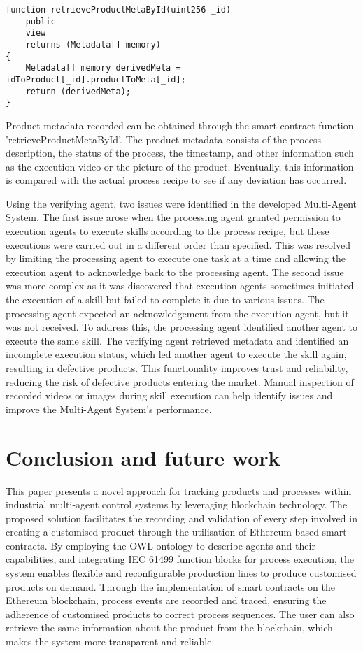 \begin{bibunit}
\begin{lstlisting}
function retrieveProductMetaById(uint256 _id)
    public
    view
    returns (Metadata[] memory)
{
    Metadata[] memory derivedMeta = idToProduct[_id].productToMeta[_id];
    return (derivedMeta);
}
\end{lstlisting}

Product metadata recorded can be obtained through the smart contract function 'retrieveProductMetaById'. The product metadata consists of the process description, the status of the process, the timestamp, and other information such as the execution video or the picture of the product. Eventually, this information is compared with the actual process recipe to see if any deviation has occurred. 

Using the verifying agent, two issues were identified in the developed Multi-Agent System. The first issue arose when the processing agent granted permission to execution agents to execute skills according to the process recipe, but these executions were carried out in a different order than specified. This was resolved by limiting the processing agent to execute one task at a time and allowing the execution agent to acknowledge back to the processing agent. The second issue was more complex as it was discovered that execution agents sometimes initiated the execution of a skill but failed to complete it due to various issues. The processing agent expected an acknowledgement from the execution agent, but it was not received. To address this, the processing agent identified another agent to execute the same skill. The verifying agent retrieved metadata and identified an incomplete execution status, which led another agent to execute the skill again, resulting in defective products. This functionality improves trust and reliability, reducing the risk of defective products entering the market. Manual inspection of recorded videos or images during skill execution can help identify issues and improve the Multi-Agent System's performance.


\section{Conclusion and future work}
\label{sec:conclusion}

This paper presents a novel approach for tracking products and processes within industrial multi-agent control systems by leveraging blockchain technology. The proposed solution facilitates the recording and validation of every step involved in creating a customised product through the utilisation of Ethereum-based smart contracts. By employing the OWL ontology to describe agents and their capabilities, and integrating IEC 61499 function blocks for process execution, the system enables flexible and reconfigurable production lines to produce customised products on demand. Through the implementation of smart contracts on the Ethereum blockchain, process events are recorded and traced, ensuring the adherence of customised products to correct process sequences. The user can also retrieve the same information about the product from the blockchain, which makes the system more transparent and reliable.


\end{bibunit}

